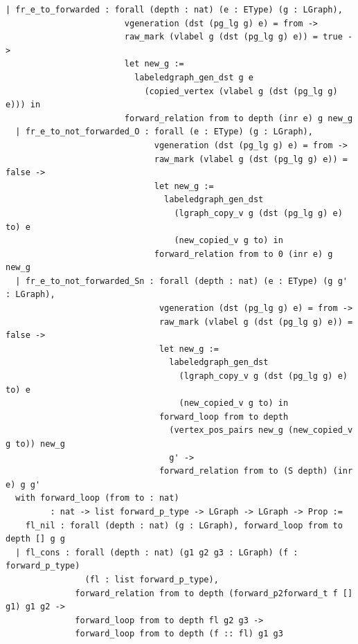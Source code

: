 \documentclass[acmsmall,screen]{acmart}  %
\providecommand{\DIFaddbegin}{} %
\providecommand{\DIFaddend}{} %
\providecommand{\DIFdelend}{} %
\newcommand{\DIFaddincludegraphics}[2][]{{\color{blue}\fbox{\DIFOincludegraphics[#1]{#2}}}} %
\DeclareRobustCommand{\DIFaddbegin}{\DIFOaddbegin \let\includegraphics\DIFaddincludegraphics} %
\DeclareRobustCommand{\DIFaddend}{\DIFOaddend \let\includegraphics\DIFOincludegraphics} %
\DeclareRobustCommand{\DIFdelend}{\DIFOaddend \let\includegraphics\DIFOincludegraphics} %
\begin{document}
\begin{lstlisting}[basicstyle=\normalfont\tiny\tt]
  | fr_e_to_forwarded : forall (depth : nat) (e : EType) (g : LGraph),
                        vgeneration (dst (pg_lg g) e) = from ->
                        raw_mark (vlabel g (dst (pg_lg g) e)) = true ->
                        let new_g :=
                          labeledgraph_gen_dst g e
                            (copied_vertex (vlabel g (dst (pg_lg g) e))) in
                        forward_relation from to depth (inr e) g new_g
  | fr_e_to_not_forwarded_O : forall (e : EType) (g : LGraph),
                              vgeneration (dst (pg_lg g) e) = from ->
                              raw_mark (vlabel g (dst (pg_lg g) e)) = false ->
                              let new_g :=
                                labeledgraph_gen_dst
                                  (lgraph_copy_v g (dst (pg_lg g) e) to) e
                                  (new_copied_v g to) in
                              forward_relation from to 0 (inr e) g new_g
  | fr_e_to_not_forwarded_Sn : forall (depth : nat) (e : EType) (g g' : LGraph),
                               vgeneration (dst (pg_lg g) e) = from ->
                               raw_mark (vlabel g (dst (pg_lg g) e)) = false ->
                               let new_g :=
                                 labeledgraph_gen_dst
                                   (lgraph_copy_v g (dst (pg_lg g) e) to) e
                                   (new_copied_v g to) in
                               forward_loop from to depth
                                 (vertex_pos_pairs new_g (new_copied_v g to)) new_g
                                 g' ->
                               forward_relation from to (S depth) (inr e) g g'
  with forward_loop (from to : nat)
         : nat -> list forward_p_type -> LGraph -> LGraph -> Prop :=
    fl_nil : forall (depth : nat) (g : LGraph), forward_loop from to depth [] g g
  | fl_cons : forall (depth : nat) (g1 g2 g3 : LGraph) (f : forward_p_type)
                (fl : list forward_p_type),
              forward_relation from to depth (forward_p2forward_t f [] g1) g1 g2 ->
              forward_loop from to depth fl g2 g3 ->
              forward_loop from to depth (f :: fl) g1 g3
\end{lstlisting} 
\DIFdelend \DIFaddbegin \pagebreak

\DIFaddend 
\end{document}
